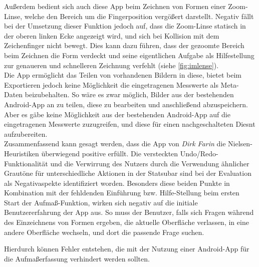 Außerdem bedient sich auch diese App beim Zeichnen von Formen einer Zoom-Linse, welche den Bereich um die Fingerposition vergößert darstellt.
Negativ fällt bei der Umsetzung dieser Funktion jedoch auf, dass die Zoom-Linse statisch in der oberen linken Ecke angezeigt wird, und sich bei Kollision mit dem Zeichenfinger nicht bewegt.
Dies kann dazu führen, dass der gezoomte Bereich beim Zeichnen die Form verdeckt und seine eigentlichen Aufgabe als Hilfestellung zur genaueren und schnelleren Zeichnung verfehlt (siehe \autoref{fig:imlense}). \\

Die App ermöglicht das Teilen von vorhandenen Bildern in diese, bietet beim Exportieren jedoch keine Möglichkeit die eingetragenen Messwerte als Meta-Daten beizubehalten.
So wäre es zwar möglich, Bilder aus der bestehenden Android-App an \im{} zu teilen, diese zu bearbeiten und anschließend abzuspeichern. 
Aber es gäbe keine Möglichkeit aus der bestehenden Android-App auf die eingetragenen Messwerte zuzugreifen, und diese für einen nachgeschalteten Diesnt aufzubereiten. \\

Zusammenfassend kann gesagt werden, dass die App \im{} von \emph{Dirk Farin} die Nielsen-Heuristiken überwiegend positive erfüllt.
Die versteckten Undo/Redo-Funktionalität und die Verwirrung des Nutzers durch die Verwendung ähnlicher Grautöne für unterschiedliche Aktionen in der Statsubar sind bei der Evaluation als Negativaspekte identifiziert worden.
Besonders diese beiden Punkte in Kombination mit der fehldenden Einführung bzw. Hilfe-Stellung beim ersten Start der Aufmaß-Funktion, wirken sich negativ auf die initiale Benutzererfahrung der App aus.
So muss der Benutzer, falls sich Fragen während des Einzeichnens von Formen ergeben, die aktuelle Oberfläche verlassen, in eine andere Oberfläche wechseln, und dort die passende Frage suchen. 

Hierdurch können Fehler entstehen, die mit der Nutzung einer Android-App für die Aufmaßerfassung verhindert werden sollten.

